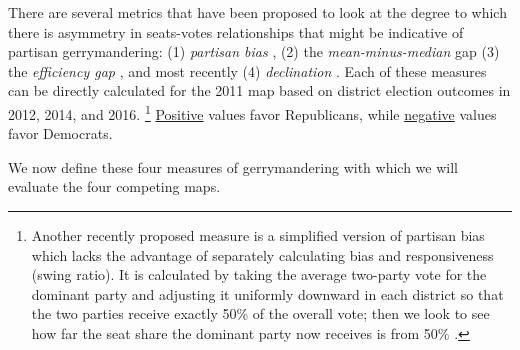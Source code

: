 %
\par
    There are several metrics that have been proposed to look at the degree to which there is asymmetry in seats-votes relationships that might be indicative of partisan gerrymandering: (1) \textit{partisan bias} \citep{Tufte1973}, (2) the \textit{mean-minus-median} gap \citep{Mcdonald_Best_2015_ELJ} (3) the \textit{efficiency gap} \citep{Stephanopoulos2014_UofChicagoLaw}, and most recently (4) \textit{declination} \citep{Warrington2018}. Each of these measures can be directly calculated for the 2011 map based on district election outcomes in 2012, 2014, and 2016.
        \footnote{Another recently proposed measure is a simplified version of partisan bias which lacks the advantage of separately calculating bias and responsiveness (swing ratio). It is calculated by taking the average two-party vote for the dominant party and adjusting it uniformly downward in each district so that the two parties receive exactly 50\% of the overall vote; then we look to see how far the seat share the dominant party now receives is from 50\% \citep{Wang2016_SLR}.}
	\underline{Positive} values favor Republicans, while \underline{negative} values favor Democrats. 
\par
    We now define these four measures of gerrymandering with which we will evaluate the four competing maps.
%
